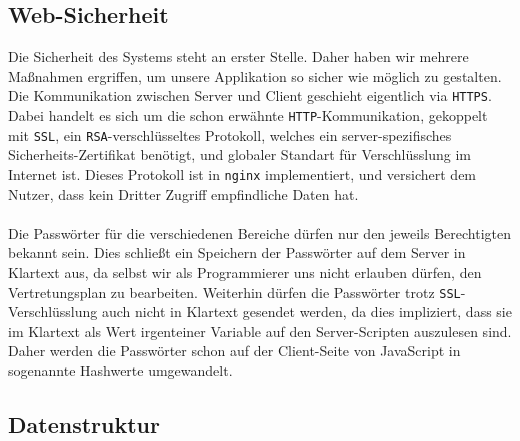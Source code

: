 \subsection{Web-Sicherheit}
Die Sicherheit des Systems steht an erster Stelle. Daher haben wir mehrere Maßnahmen ergriffen,
um unsere Applikation so sicher wie möglich zu gestalten. Die Kommunikation zwischen Server
und Client geschieht eigentlich via \texttt{HTTPS}. Dabei handelt es sich um die schon erwähnte
\texttt{HTTP}-Kommunikation, gekoppelt mit \texttt{SSL}, ein \texttt{RSA}-verschlüsseltes Protokoll,
welches ein server-spezifisches Sicherheits-Zertifikat benötigt, und globaler Standart für
Verschlüsslung im Internet ist. Dieses Protokoll ist in \texttt{nginx} implementiert, und versichert
dem Nutzer, dass kein Dritter Zugriff empfindliche Daten hat.\\\\
Die Passwörter für die verschiedenen Bereiche dürfen nur den jeweils Berechtigten bekannt sein. Dies
schließt ein Speichern der Passwörter auf dem Server in Klartext aus, da selbst wir als Programmierer
uns nicht erlauben dürfen, den Vertretungsplan zu bearbeiten. Weiterhin dürfen die Passwörter trotz
\texttt{SSL}-Verschlüsslung auch nicht in Klartext gesendet werden, da dies impliziert, dass sie im
Klartext als Wert irgenteiner Variable auf den Server-Scripten auszulesen sind. Daher werden die
Passwörter schon auf der Client-Seite von JavaScript in sogenannte Hashwerte umgewandelt.

\subsection{Datenstruktur}

